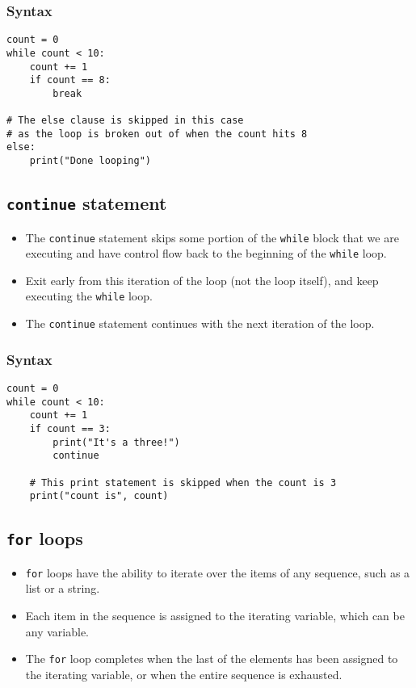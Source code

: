 \documentclass[11pt]{article}
\begin{document}
\subsubsection{Syntax}
\label{sec:org36e9304}
\begin{verbatim}
count = 0
while count < 10:
    count += 1
    if count == 8:
        break

# The else clause is skipped in this case
# as the loop is broken out of when the count hits 8
else:
    print("Done looping")
\end{verbatim}

 \newpage

\subsection{\texttt{continue} statement}
\label{sec:orga9b4c91}
\begin{itemize}
\item The \texttt{continue} statement skips some portion of the \texttt{while} block that we are executing and have control flow back to the beginning of the \texttt{while} loop.
\item Exit early from this iteration of the loop (not the loop itself), and keep executing the \texttt{while} loop.
\item The \texttt{continue} statement continues with the next iteration of the loop.
\end{itemize}

\subsubsection{Syntax}
\label{sec:org98956c4}
\begin{verbatim}
count = 0
while count < 10:
    count += 1
    if count == 3:
        print("It's a three!")
        continue

    # This print statement is skipped when the count is 3
    print("count is", count)
\end{verbatim}

 \newpage

\subsection{\texttt{for} loops}
\label{sec:org850de87}
\begin{itemize}
\item \texttt{for} loops have the ability to iterate over the items of any sequence, such as a list or a string.
\item Each item in the sequence is assigned to the iterating variable, which can be any variable.
\item The \texttt{for} loop completes when the last of the elements has been assigned to the iterating variable, or when the entire sequence is exhausted.
\end{itemize}
\end{document}
